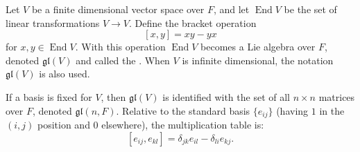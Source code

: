 Let $V$ be a finite dimensional vector space over $F$, and let $\operatorname{End} V$ be the set of linear transformations $V \to V$. Define the bracket operation
$$[x, y] = xy - yx$$
for $x, y \in \operatorname{End} V$. With this operation $\operatorname{End} V$ becomes a Lie algebra over $F$, denoted $\mathfrak{gl}(V)$ and called the . When $V$ is infinite dimensional, the notation $\mathfrak{gl}(V)$ is also used.

If a basis is fixed for $V$, then $\mathfrak{gl}(V)$ is identified with the set of all $n \times n$ matrices over $F$, denoted $\mathfrak{gl}(n, F)$. Relative to the standard basis $\{e_{ij}\}$ (having $1$ in the $(i, j)$ position and $0$ elsewhere), the multiplication table is:
$$[e_{ij}, e_{kl}] = \delta_{jk}e_{il} - \delta_{li}e_{kj}.$$

